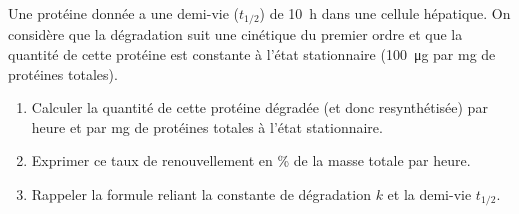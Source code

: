 \documentclass[11pt]{article}
\begin{document}
\begin{exercice}
Une protéine donnée a une demi-vie ($t_{1/2}$) de \SI{10}{\hour} dans une cellule hépatique. On considère que la dégradation suit une cinétique du premier ordre et que la quantité de cette protéine est constante à l'état stationnaire (\SI{100}{\micro\gram} par mg de protéines totales).
\begin{enumerate}
    \item Calculer la quantité de cette protéine dégradée (et donc resynthétisée) par heure et par mg de protéines totales à l'état stationnaire.
    \item Exprimer ce taux de renouvellement en \% de la masse totale par heure.
    \item Rappeler la formule reliant la constante de dégradation $k$ et la demi-vie $t_{1/2}$.
\end{enumerate}
\end{exercice}
\end{document}
